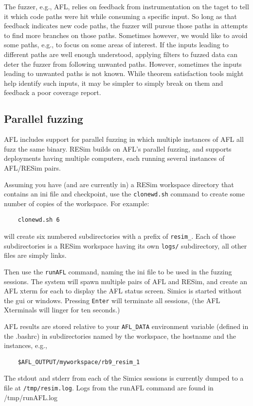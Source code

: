 \documentclass[titlepage]{article}
\begin{document}
The fuzzer, e.g., AFL, relies on feedback from instrumentation on the taget to tell it which code paths
were hit while consuming a specific input.  So long as that feedback indicates new code paths, the fuzzer
will pursue those paths in attempts to find more branches on those paths.  Sometimes however, we would like
to avoid some paths, e.g., to focus on some areas of interest.  If the inputs leading to different paths
are well enough understood, applying filters to fuzzed data can deter the fuzzer from following unwanted paths.
However, sometimes the inputs leading to unwanted paths is not known.  While theorem satisfaction tools might
help identify such inputs, it may be simpler to simply break on them and feedback a poor coverage report.

\subsection{Parallel fuzzing}
\label{parallel-fuzzing}
AFL includes support for parallel fuzzing in which multiple instances of AFL all fuzz the same binary.
RESim builds on AFL's parallel fuzzing, and supports deployments having multiple computers, each running
several instances of AFL/RESim pairs.

Assuming you have (and are currently in) a RESim workspace directory that contains an ini file and checkpoint, use the {\tt clonewd.sh}
command to create some number of copies of the workspace.  For example:
\begin{verbatim}
    clonewd.sh 6
\end{verbatim}
\noindent will create six numbered subdirectories with a prefix of {\tt resim\_}.  Each of those subdirectories is a RESim workspace
having its own {\tt logs/} subdirectory,  all other files are simply links.

Then use the {\tt runAFL} command, naming the ini file to be used in the fuzzing sessions.  The system will spawn multiple pairs of
AFL and RESim, and create an AFL xterm for each to display the AFL status screen.  Simics is started without the gui or windows.
Pressing {\tt Enter} will terminate all sessions, (the AFL Xterminals will linger for ten seconds.)

AFL results are stored relative to your {\tt AFL\_DATA} environment variable (defined in the .bashrc) in subdirectories named by the workspace, the hostname and the instances, e.g.,
\begin{verbatim}
    $AFL_OUTPUT/myworkspace/rb9_resim_1
\end{verbatim}
The stdout and stderr from each of the Simics sessions is currently dumped to a file at {\tt /tmp/resim.log}.
Logs from the runAFL command are found in /tmp/runAFL.log
\end{document}
